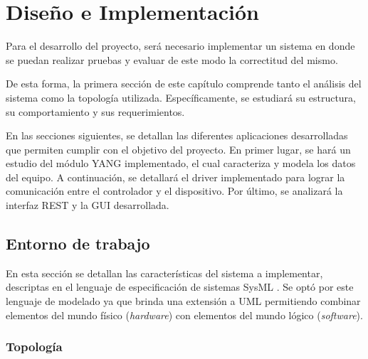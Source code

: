 
\chapter{Diseño e Implementación} %

\label{Chapter4} %
Para el desarrollo del proyecto, será necesario implementar un sistema en donde se puedan realizar pruebas y evaluar de este modo la correctitud del mismo. 

De esta forma, la primera sección de este capítulo comprende tanto el análisis del sistema como la topología utilizada. Específicamente, se estudiará su estructura, su comportamiento y sus requerimientos. 

En las secciones siguientes, se detallan las diferentes aplicaciones desarrolladas que permiten cumplir con el objetivo del proyecto. En primer lugar, se hará un estudio del módulo YANG implementado, el cual caracteriza y modela los datos del equipo. A continuación, se detallará el driver implementado para lograr la comunicación entre el controlador y el dispositivo. Por último, se analizará la interfaz REST y la GUI desarrollada.


\section{Entorno de trabajo}
En esta sección se detallan las características del sistema a implementar, descriptas en el lenguaje de especificación de sistemas SysML \parencite{sysml}. Se optó por este lenguaje de modelado ya que brinda una extensión a UML permitiendo combinar elementos del mundo físico (\textit{hardware}) con elementos del mundo lógico (\textit{software}). 


\subsection{Topología}

